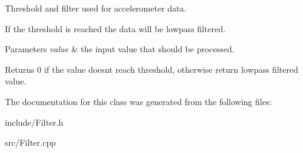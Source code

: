 Threshold and filter used for accelerometer data. 

If the threshold is reached the data will be lowpass filtered.


\begin{DoxyParams}{Parameters}
{\em value} & the input value that should be processed. \\
\hline
\end{DoxyParams}
\begin{DoxyReturn}{Returns}
0 if the value doesn\textquotesingle{}t reach threshold, otherwise return lowpass filtered value. 
\end{DoxyReturn}


The documentation for this class was generated from the following files\+:\begin{DoxyCompactItemize}
\item 
include/Filter.\+h\item 
src/Filter.\+cpp\end{DoxyCompactItemize}
